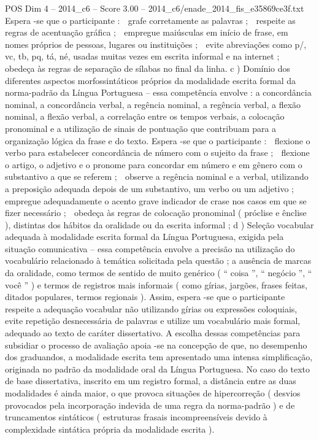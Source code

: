 \begin{textsample}{POS Dim 4 – 2014\_c6 – Score 3.00 – 2014\_c6/enade\_2014\_fis\_e35869ce3f.txt}
Espera -se que o participante :  grafe corretamente as palavras ;  respeite as regras de acentuação gráfica ;  empregue maiúsculas em início de frase, em nomes próprios de pessoas, lugares ou instituições ;  evite abreviações como p/, vc, tb, pq, tá, né, usadas muitas vezes em escrita informal e na internet ;  obedeça às regras de separação de sílabas no final da linha. c ) Domínio dos diferentes aspectos morfossintáticos próprios da modalidade escrita formal da norma-padrão da Língua Portuguesa – essa competência envolve : a concordância nominal, a concordância verbal, a regência nominal, a regência verbal, a flexão nominal, a flexão verbal, a correlação entre os tempos verbais, a colocação pronominal e a utilização de sinais de pontuação que contribuam para a organização lógica da frase e do texto.
Espera -se que o participante :  flexione o verbo para estabelecer concordância de número com o sujeito da frase ;  flexione o artigo, o adjetivo e o pronome para concordar em número e em gênero com o substantivo a que se referem ;  observe a regência nominal e a verbal, utilizando a preposição adequada depois de um substantivo, um verbo ou um adjetivo ;  empregue adequadamente o acento grave indicador de crase nos casos em que se fizer necessário ;  obedeça às regras de colocação pronominal ( próclise e ênclise ), distintas dos hábitos da oralidade ou da escrita informal ; d ) Seleção vocabular adequada à modalidade escrita formal da Língua Portuguesa, exigida pela situação comunicativa – essa competência envolve a precisão na utilização do vocabulário relacionado à temática solicitada pela questão ; a ausência de marcas da oralidade, como termos de sentido de muito genérico ( “ coisa ”, “ negócio ”, “ você ” ) e termos de registros mais informais ( como gírias, jargões, frases feitas, ditados populares, termos regionais ).
Assim, espera -se que o participante respeite a adequação vocabular não utilizando gírias ou expressões coloquiais, evite repetição desnecessária de palavras e utilize um vocabulário mais formal, adequado ao texto de caráter dissertativo.
A escolha dessas competências para subsidiar o processo de avaliação apoia -se na concepção de que, no desempenho dos graduandos, a modalidade escrita tem apresentado uma intensa simplificação, originada no padrão da modalidade oral da Língua Portuguesa.
No caso do texto de base dissertativa, inscrito em um registro formal, a distância entre as duas modalidades é ainda maior, o que provoca situações de hipercorreção ( desvios provocados pela incorporação indevida de uma regra da norma-padrão ) e de truncamentos sintáticos ( estruturas frasais incompreensíveis devido à complexidade sintática própria da modalidade escrita ).

\end{textsample}
